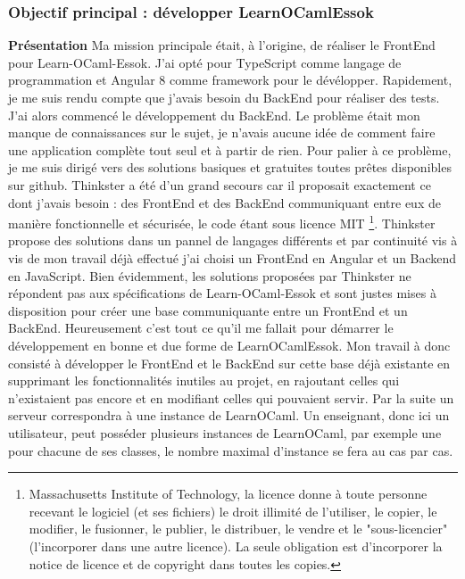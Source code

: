 \documentclass{article}
\begin{document}
\subsubsection{Objectif principal : développer LearnOCamlEssok}
\textbf{Présentation}
\newline
\newline
Ma mission principale était, à l'origine, de réaliser le FrontEnd pour Learn-OCaml-Essok.
J'ai opté pour TypeScript comme langage de programmation et Angular 8 comme framework pour le dévélopper.
\newline
\newline
Rapidement, je me suis rendu compte que j'avais besoin du BackEnd pour réaliser des tests. J'ai alors commencé le développement du BackEnd.
Le problème était mon manque de connaissances sur le sujet, je n'avais aucune idée de comment faire une application complète tout seul et à partir de rien. Pour palier à ce problème, je me suis dirigé vers des solutions basiques et gratuites toutes prêtes disponibles sur github.
\newline
\newline
Thinkster a été d'un grand secours car il proposait exactement ce dont j'avais besoin : des FrontEnd et des BackEnd communiquant entre eux de manière fonctionnelle et sécurisée, le code étant sous licence MIT \footnote{\label{MIT} Massachusetts Institute of Technology, la licence donne à toute personne recevant le logiciel (et ses fichiers) le droit illimité de l'utiliser, le copier, le modifier, le fusionner, le publier, le distribuer, le vendre et le "sous-licencier" (l'incorporer dans une autre licence). La seule obligation est d'incorporer la notice de licence et de copyright dans toutes les copies.}.
\newline
Thinkster propose des solutions dans un pannel de langages différents et par continuité vis à vis de mon travail déjà effectué j'ai choisi un FrontEnd en Angular et un Backend en JavaScript.
\newline
\newline
Bien évidemment, les solutions proposées par Thinkster ne répondent pas aux spécifications de Learn-OCaml-Essok et sont justes mises à disposition pour créer une base communiquante entre un FrontEnd et un BackEnd. Heureusement c'est tout ce qu'il me fallait pour démarrer le développement en bonne et due forme de LearnOCamlEssok.
\newline
Mon travail à donc consisté à développer le FrontEnd et le BackEnd sur cette base déjà existante en supprimant les fonctionnalités inutiles au projet, en rajoutant celles qui n'existaient pas encore et en modifiant celles qui pouvaient servir.
\newline
\newline
Par la suite un serveur correspondra à une instance de LearnOCaml. Un enseignant, donc ici un utilisateur, peut posséder plusieurs instances de LearnOCaml, par exemple une pour chacune de ses classes, le nombre maximal d'instance se fera au cas par cas.
\newpage
\end{document}
